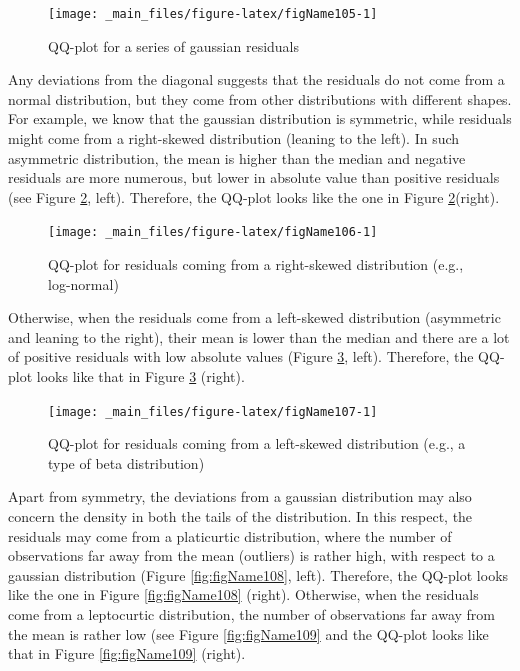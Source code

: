 \documentclass[a4paper,12pt,oneside]{book}
\begin{document}
\begin{figure}

{\centering \texttt{[image: \_main\_files/figure-latex/figName105-1]} 

}

\caption{QQ-plot for a series of gaussian residuals}\label{fig:figName105}
\end{figure}

Any deviations from the diagonal suggests that the residuals do not come from a normal distribution, but they come from other distributions with different shapes. For example, we know that the gaussian distribution is symmetric, while residuals might come from a right-skewed distribution (leaning to the left). In such asymmetric distribution, the mean is higher than the median and negative residuals are more numerous, but lower in absolute value than positive residuals (see Figure \ref{fig:figName106}, left). Therefore, the QQ-plot looks like the one in Figure \ref{fig:figName106}(right).

\begin{figure}

{\centering \texttt{[image: \_main\_files/figure-latex/figName106-1]} 

}

\caption{QQ-plot for residuals coming from a right-skewed distribution (e.g., log-normal)}\label{fig:figName106}
\end{figure}

Otherwise, when the residuals come from a left-skewed distribution (asymmetric and leaning to the right), their mean is lower than the median and there are a lot of positive residuals with low absolute values (Figure \ref{fig:figName107}, left). Therefore, the QQ-plot looks like that in Figure \ref{fig:figName107} (right).

\begin{figure}

{\centering \texttt{[image: \_main\_files/figure-latex/figName107-1]} 

}

\caption{QQ-plot for residuals coming from a left-skewed distribution (e.g., a type of beta distribution)}\label{fig:figName107}
\end{figure}

Apart from symmetry, the deviations from a gaussian distribution may also concern the density in both the tails of the distribution. In this respect, the residuals may come from a platicurtic distribution, where the number of observations far away from the mean (outliers) is rather high, with respect to a gaussian distribution (Figure \ref{fig:figName108}, left). Therefore, the QQ-plot looks like the one in Figure \ref{fig:figName108} (right). Otherwise, when the residuals come from a leptocurtic distribution, the number of observations far away from the mean is rather low (see Figure \ref{fig:figName109} and the QQ-plot looks like that in Figure \ref{fig:figName109} (right).
\end{document}
